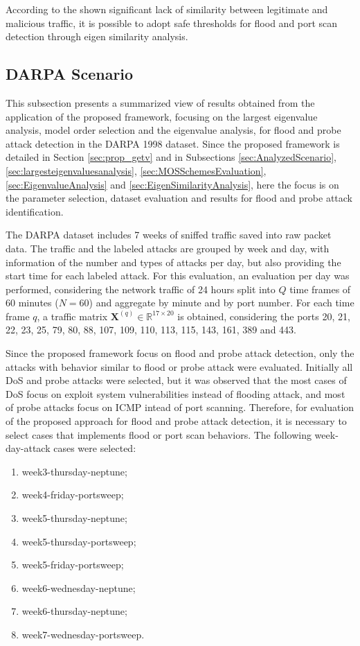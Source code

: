 \documentclass[review]{elsarticle}
\begin{document}
According to the shown significant lack of similarity between legitimate and malicious traffic, it is possible to adopt safe thresholds for flood and port scan detection through eigen similarity analysis.

\subsection{DARPA Scenario}
\label{sec:DarpaEvaluation}

This subsection presents a summarized view of results obtained from the application of the proposed framework, focusing on the largest eigenvalue analysis, model order selection and the eigenvalue analysis, for flood and probe attack detection in the DARPA 1998 dataset. Since the proposed framework is detailed in Section \ref{sec:prop_getv} and in Subsections \ref{sec:AnalyzedScenario}, \ref{sec:largesteigenvaluesanalysis}, \ref{sec:MOSSchemesEvaluation}, \ref{sec:EigenvalueAnalysis} and \ref{sec:EigenSimilarityAnalysis}, here the focus is on the parameter selection, dataset evaluation and results for flood and probe attack identification.

The DARPA dataset includes 7 weeks of sniffed traffic saved into raw packet data. The traffic and the labeled attacks are grouped by week and day, with information of the number and types of attacks per day, but also providing the start time for each labeled attack. For this evaluation, an evaluation per day was performed, considering the network traffic of 24 hours split into $Q$ time frames of 60 minutes ($N = 60$) and aggregate by minute and by port number. For each time frame $q$, a traffic matrix $\boldsymbol{X}^{(q)} \in \mathbb{R}^{17 \times 20}$ is obtained, considering the ports 20, 21, 22, 23, 25, 79, 80, 88, 107, 109, 110, 113, 115, 143, 161, 389 and 443.

Since the proposed framework focus on flood and probe attack detection, only the attacks with behavior similar to flood or probe attack were evaluated. Initially all DoS and probe attacks were selected, but it was observed that the most cases of DoS focus on exploit system vulnerabilities instead of flooding attack, and most of probe attacks focus on ICMP intead of port scanning. Therefore, for evaluation of the proposed approach for flood and probe attack detection, it is necessary to select cases that implements flood or port scan behaviors. The following week-day-attack cases  were selected: 

\begin{enumerate}
	\item week3-thursday-neptune;
	\item week4-friday-portsweep;
	\item week5-thursday-neptune;
	\item week5-thursday-portsweep;
	\item week5-friday-portsweep;
	\item week6-wednesday-neptune;
	\item week6-thursday-neptune;
	\item week7-wednesday-portsweep.
\end{enumerate}
\end{document}

